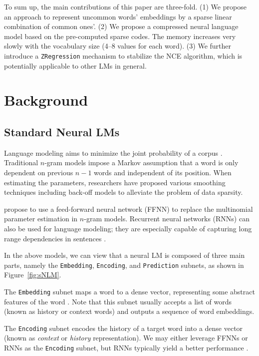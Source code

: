 \documentclass[11pt]{article}
\def\Embedding{\texttt{Embedding}}
\def\Encoding{\texttt{Encoding}}
\def\Prediction{\texttt{Prediction}}
\begin{document}
To sum up, the main contributions of this paper are three-fold.
(1) We propose an approach to represent uncommon words' embeddings by a sparse linear combination of common ones'.
(2) We propose a compressed neural language model based on the pre-computed sparse codes. The memory increases very slowly with the vocabulary size (4--8 values for each word).
(3) We further introduce a \texttt{ZRegression} mechanism to stabilize the NCE algorithm, which is potentially applicable to other LMs in general.


\section{Background}
\subsection{Standard Neural LMs}
Language modeling aims to minimize the joint probability of a corpus \cite{NLP}.
Traditional $n$-gram models impose a Markov assumption that a word is only dependent on previous $n-1$ words
and independent of its position.
When estimating the parameters, researchers have proposed various smoothing techniques including back-off models to alleviate the problem of data sparsity.

 propose to use a feed-forward neural network (FFNN) to replace the multinomial parameter estimation in $n$-gram models. Recurrent neural networks (RNNs) can also be used for language modeling; they are especially capable of capturing long range dependencies in sentences \cite{RNNLM,Sundermeyer:2015gj}.

In the above models, we can view that a neural LM is composed of three main parts, namely the \Embedding{}, \Encoding{}, and \Prediction{} subnets, as shown in Figure~\ref{fig:sNLM}.


The \Embedding{} subnet maps a word to a dense vector, representing some abstract features of the word \cite{word2vec}. Note that this subnet usually accepts a list of words (known as history or context words) and outputs a sequence of word embeddings.

The \Encoding{} subnet encodes the history of a target word into a dense vector (known as \textit{context} or \textit{history} representation). We may either leverage FFNNs \cite{NLM} or RNNs \cite{RNNLM} as the \Encoding{} subnet, but RNNs typically yield a better performance \cite{Sundermeyer:2015gj}.
\end{document}
